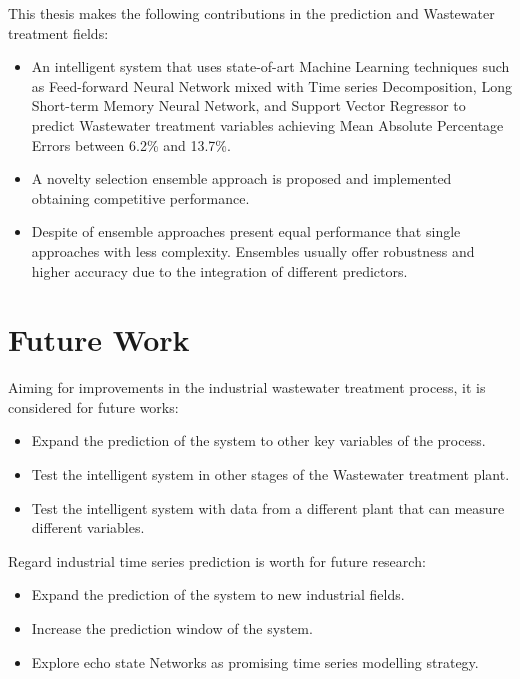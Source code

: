 This thesis makes the following contributions in the prediction and Wastewater  treatment fields:
\begin{itemize}
    \item An intelligent system that uses state-of-art Machine Learning techniques such as Feed-forward Neural Network mixed with Time series Decomposition, Long Short-term Memory Neural Network, and Support Vector Regressor to predict Wastewater treatment variables achieving Mean Absolute Percentage Errors between 6.2\% and 13.7\%.
    \item A novelty selection ensemble approach is proposed and implemented obtaining competitive performance.
    \item Despite of ensemble approaches present equal performance that single approaches with less complexity. Ensembles usually offer robustness and higher accuracy due to the integration of different predictors.
\end{itemize}
 

\section{Future Work}
Aiming for improvements in the industrial wastewater treatment process, it is considered for future works:
\begin{itemize}
    \item Expand the prediction of the system to other key variables of the process.
    \item Test the intelligent system in other stages of the Wastewater treatment plant.
    \item Test the intelligent system with data from a different plant that can measure different variables.
\end{itemize}
Regard industrial time series prediction is worth for future research:
\begin{itemize}
    \item Expand the prediction of the system to new industrial fields.
    \item Increase the prediction window of the system.
    \item Explore echo state Networks as promising time series modelling strategy.
\end{itemize}

